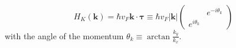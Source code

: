 \begin{equation}
    H_K(\bm k)=\hbar v_F\bm k\cdot\bm\tau\equiv\hbar v_F|\bm k|\left(\begin{array}{cc}
                      & e^{-i\theta_k} \\
        e^{i\theta_k} &
    \end{array}\right)
\end{equation}
with the angle of the momentum $\theta_k\equiv\arctan\frac{k_y}{k_x}$.


